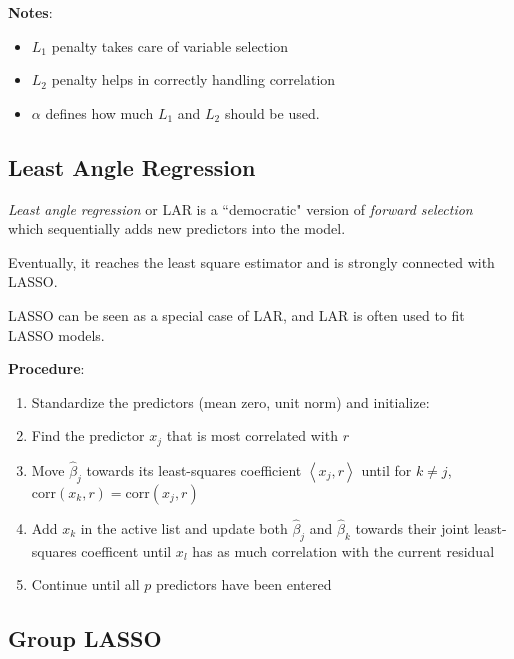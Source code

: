 \documentclass[twoside,twocolumn,10pt]{revtex4-1}
\begin{document}
	\textbf{Notes}:
	
	\begin{itemize}
	\item $L_1$ penalty takes care of variable selection
	\item $L_2$ penalty helps in correctly handling correlation
	\item $\alpha$ defines how much $L_1$ and $L_2$ should be used.
	\end{itemize}
		
	\subsection{Least Angle Regression}
	
	\textit{Least angle regression} or LAR is a ``democratic" version of \textit{forward selection} which sequentially adds new predictors into the model.
	
	Eventually, it reaches the least square estimator and is strongly connected with LASSO.
	
	LASSO can be seen as a special case of LAR, and LAR is often used to fit LASSO models.
	
	\textbf{Procedure}:
	
	\begin{enumerate}
	\item Standardize the predictors (mean zero, unit norm) and initialize:
	\item Find the predictor $x_j$ that is most correlated with $r$
	\item Move $\hat{\beta}_j$ towards its least-squares coefficient $\left\langle x_j, r \right\rangle$ until for $k \neq j$, $\text{corr}(x_k,r) = \text{corr}(x_j, r)$
	
	\item Add $x_k$ in the active list and update both $\hat{\beta}_j$ and $\hat{\beta}_k$ towards their joint least-squares coefficent until $x_l$ has as much correlation with the current residual
	
	\item Continue until all $p$ predictors have been entered
	\end{enumerate}
	 
	\subsection{Group LASSO}
	
\end{document}

